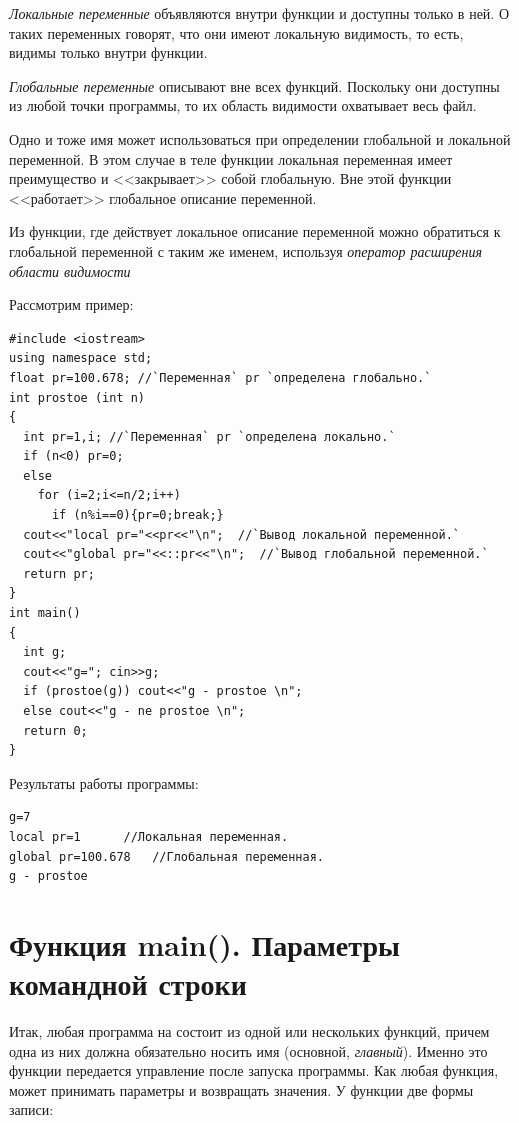 \emph{Локальные переменные} объявляются внутри функции и доступны только в ней. О таких переменных говорят,
что они имеют локальную видимость, то есть, видимы только внутри функции. 

\emph{Глобальные переменные} описывают вне всех функций. Поскольку они доступны из любой точки программы,
то их область видимости охватывает весь файл.

Одно и тоже имя может использоваться при определении глобальной и локальной переменной. В этом случае в теле функции
локальная переменная имеет преимущество и <<закрывает>> собой глобальную. Вне этой функции <<работает>> глобальное описание
переменной.

Из функции, где действует локальное описание переменной можно обратиться к глобальной переменной с таким же именем,
используя \emph{оператор расширения области видимости}


Рассмотрим пример:
\begin{lstlisting}
#include <iostream> 
using namespace std;
float pr=100.678; //`Переменная` pr `определена глобально.`
int prostoe (int n) 
{
  int pr=1,i; //`Переменная` pr `определена локально.`
  if (n<0) pr=0; 
  else 
    for (i=2;i<=n/2;i++) 
      if (n%i==0){pr=0;break;} 
  cout<<"local pr="<<pr<<"\n";  //`Вывод локальной переменной.`
  cout<<"global pr="<<::pr<<"\n";  //`Вывод глобальной переменной.`
  return pr; 
} 
int main()
{
  int g;
  cout<<"g="; cin>>g;
  if (prostoe(g)) cout<<"g - prostoe \n";
  else cout<<"g - ne prostoe \n";
  return 0;
}
\end{lstlisting}
Результаты работы программы:
\begin{verbatim}
g=7 
local pr=1 		//Локальная переменная.
global pr=100.678 	//Глобальная переменная.
g - prostoe 
\end{verbatim}

\section[Функция main(). Параметры командной строки]{Функция main(). Параметры командной строки}\label{ch04:9}
Итак, любая программа на  состоит из одной или нескольких функций, причем одна из них должна обязательно носить
имя  (основной, \emph{главный}). Именно это функции передается управление после
запуска программы. Как любая функция,  может принимать параметры и возвращать значения. У
функции  две формы записи: 

